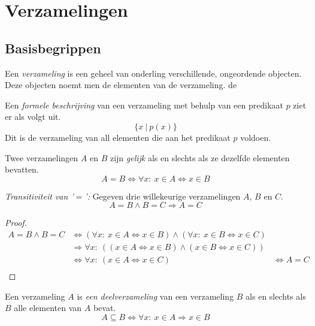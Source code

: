 \documentclass[main.tex]{subfiles}
\begin{document}
\chapter{Verzamelingen}
\label{cha:verzamelingen}

\section{Basisbegrippen}
\label{sec:basisbegrippen}

\begin{de}
  Een \emph{verzameling} is een geheel van onderling verschillende, ongeordende objecten. Deze objecten noemt men de elementen van de verzameling.
de 
\end{de}

\begin{de}
  Een \emph{formele beschrijving} van een verzameling met behulp van een predikaat $p$ ziet er als volgt uit.
  \[ \{x\ |\ p(x)\} \]
  Dit is de verzameling van all elementen die aan het predikaat $p$ voldoen.
\end{de}

\begin{de}
  Twee verzamelingen $A$ en $B$ zijn \emph{gelijk} als en slechts als ze dezelfde elementen bevatten. 
  \[ A = B \Leftrightarrow \forall x:\ x \in A \Leftrightarrow x \in B \]
\end{de}

\begin{st}
  \emph{Transitiviteit van '$=$':} Gegeven drie willekeurige verzamelingen $A$, $B$ en $C$.
  \[ A = B \wedge B = C \Rightarrow A = C \]
  \begin{proof}
    \[
    \begin{array}{cll}
      A = B \wedge B = C &\Leftrightarrow (\forall x:\ x \in A \Leftrightarrow x \in B) \wedge (\forall x:\ x \in B \Leftrightarrow x \in C) &\\
      &\Rightarrow \forall x:\ ((x \in A \Leftrightarrow x \in B) \wedge (x \in B \Leftrightarrow x \in C)) &\\
      &\Leftrightarrow \forall x:\ (x \in A \Leftrightarrow x \in C) &\Leftrightarrow  A = C\\
    \end{array}
    \]
  \end{proof}
\end{st}

\begin{de}
  Een verzameling $A$ is \emph{een deelverzameling} van een verzameling $B$ als en slechts als $B$ alle elementen van $A$ bevat.
  \[ A \subseteq B \Leftrightarrow \forall x:\ x \in A \Rightarrow x \in B\]
\end{de}
\end{document}
